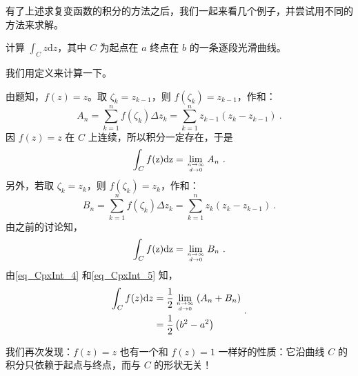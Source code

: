 有了上述求复变函数的积分的方法之后，我们一起来看几个例子，并尝试用不同的方法来求解。
\begin{example}{}
计算 $\displaystyle \int _ C z \mathrm dz$，其中 $C$ 为起点在 $a$ 终点在 $b$ 的一条逐段光滑曲线。

我们用定义来计算一下。

由题知，$f(z)=z$。取 $\zeta_k=z_{k-1}$，则 $f\left(\zeta_{k}\right)=z_{k-1}$，作和：
\begin{equation}
A_{n}=\sum_{k=1}^{n} f\left(\zeta_{k}\right) \Delta z_{k}=\sum_{k=1}^{n} z_{k-1}\left(z_{k}-z_{k-1}\right)~.
\end{equation}
因 $f(z)=z$ 在 $C$ 上连续，所以积分一定存在，于是
\begin{equation} \label{eq_CpxInt_4}
\int_{C} f(\mathrm{z}) \mathrm{d} \mathrm{z}=\lim _{n \rightarrow \infty \atop d \rightarrow 0} A_{n}~.
\end{equation}
另外，若取 $\zeta_k=z_k$，则 $f\left(\zeta_{k}\right)=z_{k}$，作和：
\begin{equation}
B_{n}=\sum_{k=1}^{n} f\left(\zeta_{k}\right) \Delta z_{k}=\sum_{k=1}^{n} z_{k}\left(z_{k}-z_{k-1}\right)~.
\end{equation}
由之前的讨论知，
\begin{equation}\label{eq_CpxInt_5}
\int_{C} f(\mathrm{z}) \mathrm{d} \mathrm{z}=\lim _{n \rightarrow \infty \atop d \rightarrow 0} B_{n}~.
\end{equation}
由\autoref{eq_CpxInt_4} 和\autoref{eq_CpxInt_5} 知，
\begin{equation}
\begin{aligned} \int_{C} f(z) \mathrm{d} z &=\frac{1}{2} \lim _{n \rightarrow \infty \atop d \rightarrow 0}\left(A_{n}+B_{n}\right) \\ &=\frac{1}{2}\left(b^{2}-a^{2}\right) \end{aligned}~.
\end{equation}
\end{example}
我们再次发现：$f (z) = z$ 也有一个和 $f(z)=1$ 一样好的性质：它沿曲线 $C$ 的积分只依赖于起点与终点，而与 $C $ 的形状无关！

